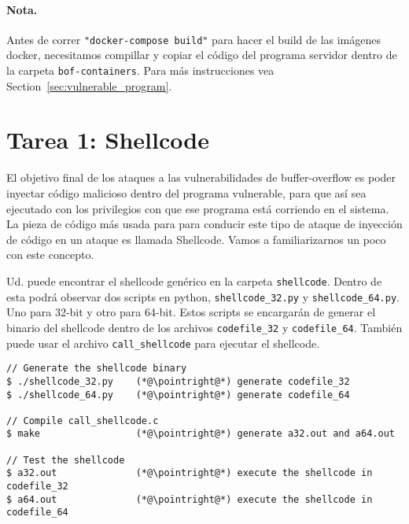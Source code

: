 


\paragraph{Nota.} Antes de correr \texttt{"docker-compose build"} para hacer el build de las imágenes docker, necesitamos compillar y copiar el código del programa servidor dentro de la carpeta \texttt{bof-containers}. Para más instrucciones vea Section~\ref{sec:vulnerable_program}.



\section{Tarea 1: Shellcode}
El objetivo final de los ataques a las vulnerabilidades de buffer-overflow es poder inyectar código malicioso dentro del programa vulnerable, para que así sea ejecutado con los privilegios con que ese programa está corriendo en el sistema.
La pieza de código más usada para para conducir este tipo de ataque de inyección de código en un ataque es llamada Shellcode.
Vamos a familiarizarnos un poco con este concepto.



Ud. puede encontrar el shellcode genérico en la carpeta \texttt{shellcode}.
Dentro de esta podrá observar dos scripts en python, \texttt{shellcode\_32.py} y \texttt{shellcode\_64.py}. 
Uno para 32-bit y otro para 64-bit.
Estos scripts se encargarán de generar el binario del shellcode dentro de los archivos \texttt{codefile\_32} y \texttt{codefile\_64}.
También puede usar el archivo \texttt{call\_shellcode} para ejecutar el shellcode. 


\newcommand{\pointright}{\ding{221}}

\begin{lstlisting}
// Generate the shellcode binary 
$ ./shellcode_32.py    (*@\pointright@*) generate codefile_32
$ ./shellcode_64.py    (*@\pointright@*) generate codefile_64

// Compile call_shellcode.c
$ make                 (*@\pointright@*) generate a32.out and a64.out 

// Test the shellcode 
$ a32.out              (*@\pointright@*) execute the shellcode in codefile_32
$ a64.out              (*@\pointright@*) execute the shellcode in codefile_64
\end{lstlisting}
 


